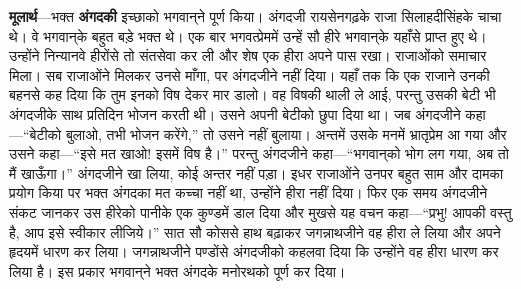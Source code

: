 \begin{sloppypar}\justifying{}
\textbf{मूलार्थ}—भक्त \textbf{अंगदकी} इच्छाको भगवान्‌ने पूर्ण किया। अंगदजी रायसेनगढ़के राजा सिलाहदी\-सिंहके चाचा थे। वे भगवान्‌के बहुत बड़े भक्त थे। एक बार भगवत्प्रेममें उन्हें सौ हीरे भगवान्‌के यहाँसे प्राप्त हुए थे। उन्होंने निन्यानवे हीरोंसे तो संतसेवा कर ली और शेष एक हीरा अपने पास रखा। राजाओंको समाचार मिला। सब राजाओंने मिलकर उनसे माँगा, पर अंगदजीने नहीं दिया। यहाँ तक कि एक राजाने उनकी बहनसे कह दिया कि तुम इनको विष देकर मार डालो। वह विषकी थाली ले आई, परन्तु उसकी बेटी भी अंगदजीके साथ प्रतिदिन भोजन करती थी। उसने अपनी बेटीको छुपा दिया था। जब अंगदजीने कहा—“बेटीको बुलाओ, तभी भोजन करेंगे,” तो उसने नहीं बुलाया। अन्तमें उसके मनमें भ्रातृप्रेम आ गया और उसने कहा—“इसे मत खाओ! इसमें विष है।” परन्तु अंगदजीने कहा—“भगवान्‌को भोग लग गया, अब तो मैं खाऊँगा।” अंगदजीने खा लिया, कोई अन्तर नहीं पड़ा। इधर राजाओंने उनपर बहुत साम और दामका प्रयोग किया पर भक्त अंगदका मत कच्चा नहीं था, उन्होंने हीरा नहीं दिया। फिर एक समय अंगदजीने संकट जानकर उस हीरेको पानीके एक कुण्डमें डाल दिया और मुखसे यह वचन कहा—“प्रभु! आपकी वस्तु है, आप इसे स्वीकार लीजिये।” सात सौ कोससे हाथ बढ़ाकर जगन्नाथजीने वह हीरा ले लिया और अपने हृदयमें धारण कर लिया। जगन्नाथजीने पण्डोंसे अंगदजीको कहलवा दिया कि उन्होंने वह हीरा धारण कर लिया है। इस प्रकार भगवान्‌ने भक्त अंगदके मनोरथको पूर्ण कर दिया।
\end{sloppypar}



